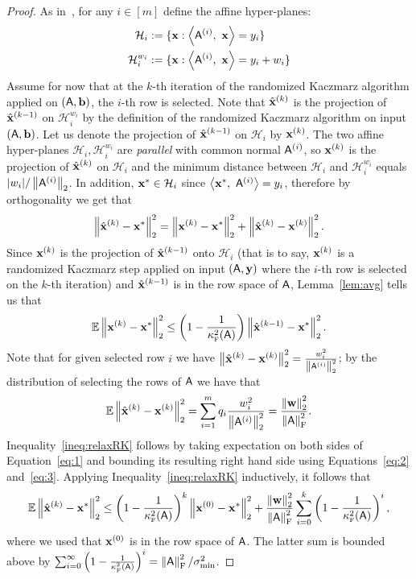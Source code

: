 \begin{proof}
As in~\cite{Needell09}, for any $i\in{[m]}$ define the affine hyper-planes:
%
\begin{align*}
\mathcal{H}_i &:= \{\mathbf{x}: \left\langle {  {\ensuremath{\mathsf{A} }}^{(i)}},\ {\mathbf{x}} \right\rangle = y_i\}\\
\mathcal{H}_i^{w_i} &:= \{\mathbf{x}: \left\langle {  {\ensuremath{\mathsf{A} }}^{(i)} },\ {\mathbf{x}} \right\rangle = y_i + w_i\}
\end{align*}
Assume for now that at the $k$-th iteration of the randomized Kaczmarz algorithm applied on $({\mathsf{A} }, {\mathbf b})$, the $i$-th row is selected. Note that $\hat{\mathbf{x}}^{(k)}$ is the projection of $\hat{\mathbf{x}}^{(k-1)}$ on $\mathcal{H}_i^{w_i}$ by the definition of the randomized Kaczmarz algorithm on input $({\mathsf{A} },{\mathbf b})$. Let us denote the projection of $\hat{\mathbf{x}}^{(k-1)}$ on $\mathcal{H}_i$ by $\mathbf{x}^{(k)}$. The two affine hyper-planes $\mathcal{H}_i,\mathcal{H}_i^{w_i}$ are \emph{parallel} with common normal ${\mathsf{A} }^{(i)}$, so $\mathbf{x}^{(k)}$ is the projection of $\hat{\mathbf{x}}^{(k)}$ on $\mathcal{H}_i$ and the minimum distance between $\mathcal{H}_i$ and $\mathcal{H}_i^{w_i}$ equals $|w_i| / \left\|{\mathsf{A} }^{(i)}\right\|_2$. In addition, $\mathbf{x}^{*}\in \mathcal{H}_i$ since $\left\langle {\mathbf{x}^{*}},\ {{\mathsf{A} }^{(i)}} \right\rangle = y_i$, therefore by orthogonality we get that
\begin{equation}\label{eq:1}
\left\|\hat{\mathbf{x}}^{(k)} - \mathbf{x}^{*}\right\|_2^2 = \left\|\mathbf{x}^{(k)} - \mathbf{x}^{*}\right\|_2^2 + \left\|\hat{\mathbf{x}}^{(k)} - \mathbf{x}^{(k)}\right\|_2^2.
\end{equation}
Since $\mathbf{x}^{(k)}$ is the projection of $\hat{\mathbf{x}}^{(k-1)}$ onto $\mathcal{H}_i$ (that is to say, $\mathbf{x}^{(k)}$ is a randomized Kaczmarz step applied on input $({\mathsf{A} }, \mathbf{y})$ where the $i$-th row is selected on the $k$-th iteration) and $\hat{\mathbf{x}}^{(k-1)}$ is in the row space of ${\mathsf{A} }$, Lemma~\ref{lem:avg} tells us that
\begin{equation}\label{eq:2}
 \operatorname{\mathbb{E}}\left\|\mathbf{x}^{(k)} - \mathbf{x}^{*}\right\|_2^2 \le \left(1 - \frac1{\kappa^2_{\textrm{\tiny F}}({\mathsf{A} })}\right) \left\|\hat{\mathbf{x}}^{(k-1)} - \mathbf{x}^{*}\right\|_2^2.
\end{equation}
Note that for given selected row $i$ we have $ \left\|\hat{\mathbf{x}}^{(k)} - \mathbf{x}^{(k)}\right\|_2^2= \frac{w_i^2}{\left\|{\mathsf{A} }^{(i)}\right\|_2^2}$;
by the distribution of selecting the rows of ${\mathsf{A} }$ we have that
\begin{equation}\label{eq:3}
\mathbb{E}\left\|\hat{\mathbf{x}}^{(k)} - \mathbf{x}^{(k)}\right\|_2^2 = \sum_{i=1}^{m} q_i \frac{w_i^2}{\left\|{\mathsf{A} }^{(i)}\right\|_2^2} = \frac{\left\|{\mathbf{w}}\right\|_2^2}{\left\|{\mathsf{A} }\right\|_{\textrm{F}}^2}.
\end{equation}
Inequality~\eqref{ineq:relaxRK} follows by taking expectation on both sides of Equation~\eqref{eq:1} and bounding its resulting right hand side using Equations~\eqref{eq:2} and~\eqref{eq:3}. Applying Inequality~\eqref{ineq:relaxRK} inductively, it follows that
\[\operatorname{\mathbb{E}} \left\|\hat{\mathbf{x}}^{(k)} - \mathbf{x}^{*}\right\|_2^2 \le \left(1-\frac1{\kappa^2_{\textrm{\tiny F}}({\mathsf{A} })}\right)^k\left\|\mathbf{x}^{(0)}- \mathbf{x}^{*}\right\|_2^2 + \frac{\left\|{\mathbf{w}}\right\|_2^2}{\left\|{\mathsf{A} }\right\|_{\textrm{F}}^2}\sum_{i=0}^{k} \left(1-\frac1{\kappa^2_{\textrm{\tiny F}}({\mathsf{A} })}\right)^i,\]
where we used that $\mathbf{x}^{(0)}$ is in the row space of ${\mathsf{A} }$. The latter sum is bounded above by $\sum_{i=0}^{\infty} \left(1-\frac1{\kappa^2_{\textrm{\tiny F}}({\mathsf{A} })}\right)^i =\left\|{\mathsf{A} }\right\|_{\textrm{F}}^2 / \sigma^2_{\min}$.
\end{proof}
%
